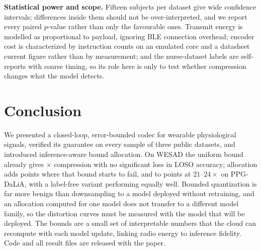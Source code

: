 \documentclass[journal,twoside,web]{ieeecolor}
\begin{document}
\textbf{Statistical power and scope.} Fifteen subjects per dataset give wide confidence intervals; differences inside them should not be over-interpreted, and we report every paired $p$-value rather than only the favourable ones. Transmit energy is modelled as proportional to payload, ignoring BLE connection overhead; encoder cost is characterized by instruction counts on an emulated core and a datasheet current figure rather than by measurement; and the nurse-dataset labels are self-reports with coarse timing, so its role here is only to test whether compression changes what the model detects.

\section{Conclusion}
We presented a closed-loop, error-bounded codec for wearable physiological signals, verified its guarantee on every sample of three public datasets, and introduced inference-aware bound allocation. On WESAD the uniform bound already gives \ratioEe$\times$ compression with no significant loss in LOSO accuracy; allocation adds \allocClfDiffBA{} points where that bound starts to fail, and \daliaallocClfDiffBA{} to \daliaallocClfDiffBD{} points at $21$--$24\times$ on PPG-DaLiA, with a label-free variant performing equally well. Bounded quantization is far more benign than downsampling to a model deployed without retraining, and an allocation computed for one model does not transfer to a different model family, so the distortion curves must be measured with the model that will be deployed. The bounds are a small set of interpretable numbers that the cloud can recompute with each model update, linking radio energy to inference fidelity. Code and all result files are released with the paper.
\end{document}
